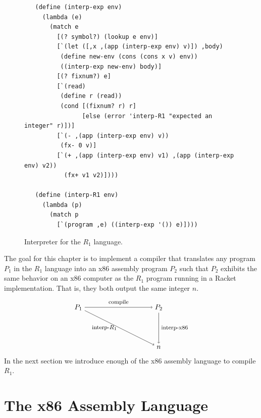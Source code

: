 \documentclass[11pt]{book}
\begin{document}
\begin{figure}[tbp]
\begin{lstlisting}
   (define (interp-exp env)
     (lambda (e)
       (match e
         [(? symbol?) (lookup e env)]
         [`(let ([,x ,(app (interp-exp env) v)]) ,body)
          (define new-env (cons (cons x v) env))
          ((interp-exp new-env) body)]
         [(? fixnum?) e]
         [`(read)
          (define r (read))
          (cond [(fixnum? r) r]
                [else (error 'interp-R1 "expected an integer" r)])]
         [`(- ,(app (interp-exp env) v))
          (fx- 0 v)]
         [`(+ ,(app (interp-exp env) v1) ,(app (interp-exp env) v2))
           (fx+ v1 v2)])))
           
   (define (interp-R1 env)
     (lambda (p)
       (match p
         [`(program ,e) ((interp-exp '()) e)])))
\end{lstlisting}
\caption{Interpreter for the $R_1$ language.}
\label{fig:interp-R1}
\end{figure}

The goal for this chapter is to implement a compiler that translates
any program $P_1$ in the $R_1$ language into an x86 assembly
program $P_2$ such that $P_2$ exhibits the same behavior on an x86
computer as the $R_1$ program running in a Racket implementation.
That is, they both output the same integer $n$.
\[
\begin{tikzpicture}[baseline=(current  bounding  box.center)]
 \node (p1) at (0,  0)   {$P_1$};
 \node (p2) at (4,  0)   {$P_2$};
 \node (o)  at (4, -2) {$n$};

 \path[->] (p1) edge [above] node {\footnotesize compile} (p2);
 \path[->] (p1) edge [left]  node {\footnotesize interp-$R_1$} (o);
 \path[->] (p2) edge [right] node {\footnotesize interp-x86} (o);
\end{tikzpicture}
\]
In the next section we introduce enough of the x86 assembly
language to compile $R_1$.

\section{The x86 Assembly Language}
\label{sec:x86}
\end{document}
